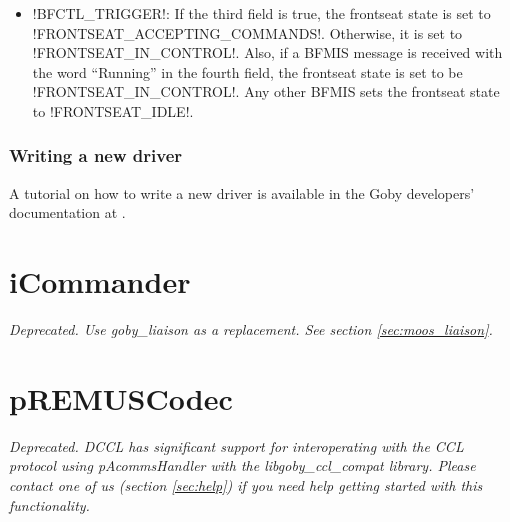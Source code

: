 \begin{itemize}
\begin{itemize}
\item !BFCTL_TRIGGER!: If the third field is true, the frontseat state is set to !FRONTSEAT_ACCEPTING_COMMANDS!. Otherwise, it is set to !FRONTSEAT_IN_CONTROL!. Also, if a BFMIS message is received with the word ``Running'' in the fourth field, the frontseat state is set to be !FRONTSEAT_IN_CONTROL!.  Any other BFMIS sets the frontseat state to !FRONTSEAT_IDLE!.
\end{itemize} 
\end{itemize}


\subsubsection{Writing a new driver}

A tutorial on how to write a new driver is available in the Goby developers' documentation at \cite{goby-doc}.


\section{iCommander}\label{sec:icommander} 

\textit{Deprecated. Use goby\_liaison as a replacement. See section \ref{sec:moos_liaison}.}

\section{pREMUSCodec}

\textit{Deprecated. DCCL has significant support for interoperating with the CCL protocol using pAcommsHandler with the libgoby\_ccl\_compat library. Please contact one of us (section \ref{sec:help}) if you need help getting started with this functionality.}

\DeleteShortVerb{\!}
